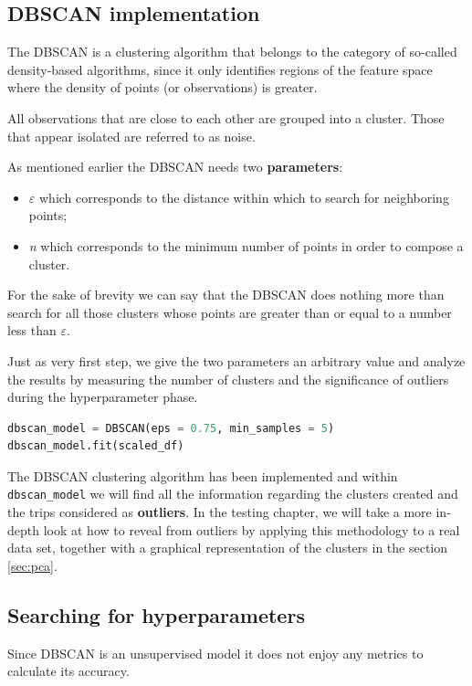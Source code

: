 \subsection{DBSCAN implementation}
The DBSCAN is a clustering algorithm that belongs to the category of so-called density-based algorithms, since it only identifies regions of the feature space where the density of points (or observations) is greater.

All observations that are close to each other are grouped into a cluster. Those that appear isolated are referred to as noise.

As mentioned earlier the DBSCAN needs two \textbf{parameters}:

\begin{itemize}
\item $\varepsilon$ which corresponds to the distance within which to search for neighboring points;
\item \textit{n} which corresponds to the minimum number of points in order to compose a cluster.
\end{itemize}

For the sake of brevity we can say that the DBSCAN does nothing more than search for all those clusters whose points are greater than or equal to a number less than $\varepsilon$.

Just as very first step, we give the two parameters an arbitrary value and analyze the results by measuring the number of clusters and the significance of outliers during the hyperparameter phase.

\begin{lstlisting}[language=Python]
dbscan_model = DBSCAN(eps = 0.75, min_samples = 5)
dbscan_model.fit(scaled_df)
\end{lstlisting}

The DBSCAN clustering algorithm has been implemented and within \verb|dbscan_model| we will find all the information regarding the clusters created and the trips considered as \textbf{outliers}. In the testing chapter, we will take a more in-depth look at how to reveal from outliers by applying this methodology to a real data set, together with a graphical representation of the clusters in the section \ref{sec:pca}.

\subsection{Searching for hyperparameters}
\label{sec:tuning}

Since DBSCAN is an unsupervised model it does not enjoy any metrics to calculate its accuracy.

